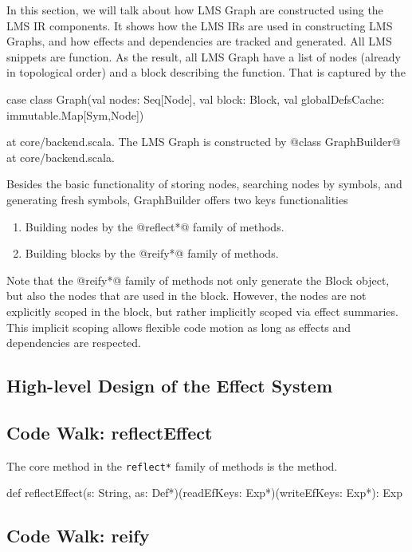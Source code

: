 In this section, we will talk about how LMS Graph are constructed using the LMS IR components.
It shows how the LMS IRs are used in constructing LMS Graphs, and how effects and dependencies are
tracked and generated.
All LMS snippets are function. As the result, all LMS Graph have a list of nodes (already in topological order)
and a block describing the function. That is captured by the
\begin{listing}[scala]
case class Graph(val nodes: Seq[Node], val block: Block, val globalDefsCache: immutable.Map[Sym,Node])
\end{listing}
at core/backend.scala. The LMS Graph is constructed by @class GraphBuilder@ at core/backend.scala.

Besides the basic functionality of storing nodes, searching nodes by symbols, and generating fresh symbols,
GraphBuilder offers two keys functionalities

\begin{enumerate}
\item Building nodes by the @reflect*@ family of methods.
\item Building blocks by the @reify*@ family of methods.
\end{enumerate}

Note that the @reify*@ family of methods not only generate the Block object, but also the nodes that are
used in the block. However, the nodes are not explicitly scoped in the block, but rather implicitly
scoped via effect summaries. This implicit scoping allows flexible code motion as long as effects and dependencies
are respected.

\subsection{High-level Design of the Effect System}



\subsection{Code Walk: reflectEffect}

The core method in the \texttt{reflect*} family of methods is the  method.
\begin{listing}[scala]
def reflectEffect(s: String, as: Def*)(readEfKeys: Exp*)(writeEfKeys: Exp*): Exp
\end{listing}

\subsection{Code Walk: reify}

